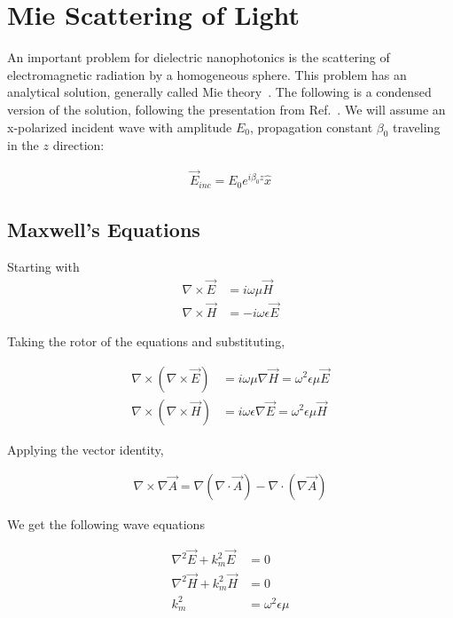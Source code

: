 \section{Mie Scattering of Light}
\label{ap:Mie}
    An important problem for dielectric nanophotonics is the scattering of electromagnetic radiation by
    a homogeneous sphere. This problem has an analytical solution, generally called Mie theory~\cite{mie1908beitrage}. The following
    is a condensed version of the solution, following the presentation from Ref.~\cite{ng2000manipulation}.
    We will assume an x-polarized incident wave with amplitude $E_0$, propagation constant $\beta_0$ traveling in the $z$ direction:

    \begin{align}
        \vec{E}_{inc} = E_0 e^{i\beta_0z}\hat{x}
    \end{align}

    \subsection{Maxwell's Equations}
        Starting with
        \begin{align}
            \nabla \times \vec{E} &= i\omega\mu\vec{H} \\
            \nabla \times \vec{H} &= -i\omega\epsilon\vec{E}
        \end{align}

        Taking the rotor of the equations and substituting,

        \begin{align}
            \nabla \times (\nabla \times \vec{E}) &= i\omega\mu \nabla \vec{H} = \omega^2 \epsilon\mu\vec{E} \\
            \nabla \times (\nabla \times \vec{H}) &= i\omega\epsilon \nabla \vec{E} = \omega^2 \epsilon\mu\vec{H}
        \end{align}

        Applying the vector identity,

        \begin{align}
            \nabla \times \nabla \vec{A} = \nabla (\nabla \cdot \vec{A}) - \nabla \cdot (\nabla\vec{A})
        \end{align}

        We get the following wave equations

        \begin{align}
            \nabla^2\vec{E} + k^2_m\vec{E} &= 0 \label{mie:waveE}\\
            \nabla^2\vec{H} + k^2_m\vec{H} &= 0 \label{mie:waveH}\\
            k^2_m &= \omega^2\epsilon\mu \label{mie:kvec}
        \end{align}

